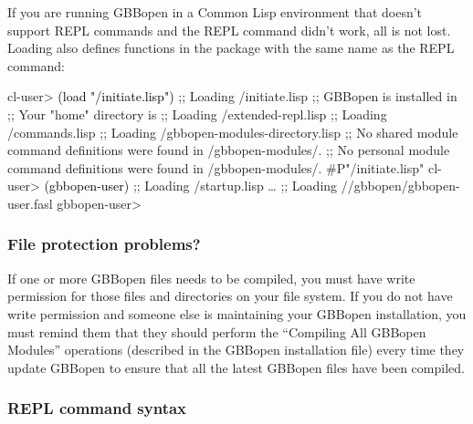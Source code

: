 \documentclass[10pt,twoside,english,pdftex]{article}
\begin{document}
If you are running GBBopen in a Common Lisp environment that doesn't support
REPL commands and the  REPL command didn't work,
all is not lost.  Loading 
also defines functions in the  package with the
same name as the REPL command:
%
\W\supp
\begin{example}
\textcolor{darkergray}{%
  cl-user> \textcolor{black}{(load "/initiate.lisp")}
  ;; Loading /initiate.lisp
  ;; GBBopen is installed in 
  ;; Your "home" directory is 
  ;;     Loading /extended-repl.lisp
  ;;     Loading /commands.lisp
  ;;     Loading /gbbopen-modules-directory.lisp
  ;; No shared module command definitions were found in /gbbopen-modules/.
  ;; No personal module command definitions were found in /gbbopen-modules/.
  #P"/initiate.lisp"
  cl-user> \textcolor{black}{(gbbopen-user)}
  ;; Loading /startup.lisp
     \textrm{\ldots{}}
  ;; Loading //gbbopen/gbbopen-user.fasl
  gbbopen-user>}
\end{example}

\subsubsection*{File protection problems?}

%
%
%
%
%
If one or more GBBopen files needs to be compiled, you must have write
permission for those files and directories on your file system.  If you do not
have write permission and someone else is maintaining your GBBopen
installation, you must remind them that they should perform the ``Compiling
All GBBopen Modules'' operations (described in the GBBopen installation
 file) every time they update GBBopen to ensure that all the
latest GBBopen files have been compiled.

\subsubsection*{REPL command syntax}
\label{sec:REPL-command-syntax}
\end{document}
